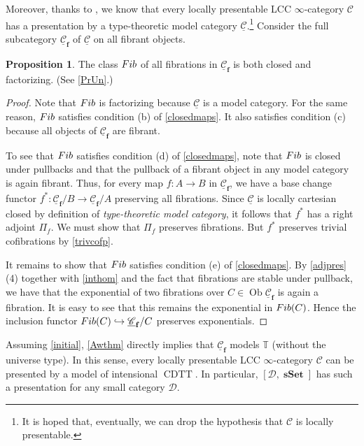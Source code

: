 \documentclass[10pt,letterpaper,cm]{nupset}
\theoremstyle{definition}
\theoremstyle{theorem}
\newtheorem{prop}[definition]{Proposition}
\theoremstyle{remark}
\DeclareMathOperator{\ob}{Ob}
\newcommand{\0}{\mathbf{0}}
\newcommand{\1}{\mathbf{1}}
\newcommand{\2}{\mathbf{2}}
\DeclareMathOperator{\cdtt}{\mathrm{CDTT}}
\DeclareMathOperator{\sset}{\mathbf{sSet}}
\renewcommand{\c}{\mathscr{C}}
\renewcommand{\d}{\mathscr{D}}
\newcommand{\T}{\mathbb T}
\DeclareMathOperator{\fib}{\mathnormal{Fib}}
\begin{document}
\medskip

Moreover, thanks to \autocite[Theorem 7.10]{GK}, we know that every locally presentable LCC $\infty$-category $\c$ has a presentation by a type-theoretic model category $\underline{\c}$.\footnote{It is hoped that, eventually, we can drop the hypothesis that $\c$ is locally presentable.} Consider the full subcategory $\underline{\c}_{\mathbf{f}}$ of $\underline{\c}$ on all fibrant objects.

\begin{prop}\label{genmodel}
The class $\fib$ of all fibrations in $\underline{\c}_{\mathbf{f}}$ is both closed and factorizing. (See \cref{PrUn}.)
\end{prop}
\begin{proof}
Note that $\fib$ is factorizing because $\underline{\c}$ is a model category. For the same reason, $\fib$ satisfies condition (b) of \cref{closedmaps}. It also satisfies condition (c) because all objects of $\underline{\c}_{\mathbf{f}}$ are fibrant.

\medskip

To see that $\fib$ satisfies condition (d) of \cref{closedmaps}, note that $\fib$ is closed under pullbacks and that the pullback of a fibrant object in any model category is again fibrant. Thus, for every map $f: A \to B$ in $\underline{\c}_{\mathbf{f}}$, we have a base change functor $f^{\ast} : \underline{\c}_{\mathbf{f}}/B \to \underline{\c}_{\mathbf{f}}/A$ preserving all fibrations.  Since  $\underline{\c}$ is locally cartesian closed by definition of \textit{type-theoretic model category}, it follows that $f^{\ast}$ has a right adjoint $\Pi_f$. We must show that $\Pi_f$ preserves fibrations. But $f^{\ast}$ preserves trivial cofibrations by \cref{trivcofp}.

\medskip

It remains to show that $\fib$ satisfies condition (e) of \cref{closedmaps}. By \cref{adjpres}(4) together with  \cref{inthom} and the fact that fibrations are stable under pullback, we have that the exponential of two fibrations over $C\in \ob{\underline{\c}_{\mathbf{f}}}$ is again a fibration. It is easy to see that this remains the exponential in $\fib(C)$.  Hence the inclusion functor $\fib(C) \hookrightarrow \underline{\c}_{\mathbf{f}}/C$ preserves exponentials.
\end{proof}

Assuming \cref{initial}, \cref{Awthm} directly implies that $\underline{\c}_{\mathbf{f}}$ models $\T$ (without the universe type). In this sense, every locally presentable LCC $\infty$-category $\c$ can be presented by a model of intensional $\cdtt$. In particular, $\left[\d, \sset\right]$ has such a presentation for any small category $\d$.
\end{document}
